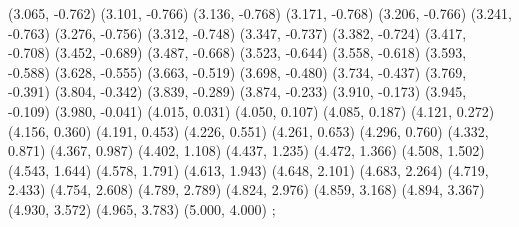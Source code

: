 {  (3.065, -0.762)
  (3.101, -0.766)
  (3.136, -0.768)
  (3.171, -0.768)
  (3.206, -0.766)
  (3.241, -0.763)
  (3.276, -0.756)
  (3.312, -0.748)
  (3.347, -0.737)
  (3.382, -0.724)
  (3.417, -0.708)
  (3.452, -0.689)
  (3.487, -0.668)
  (3.523, -0.644)
  (3.558, -0.618)
  (3.593, -0.588)
  (3.628, -0.555)
  (3.663, -0.519)
  (3.698, -0.480)
  (3.734, -0.437)
  (3.769, -0.391)
  (3.804, -0.342)
  (3.839, -0.289)
  (3.874, -0.233)
  (3.910, -0.173)
  (3.945, -0.109)
  (3.980, -0.041)
  (4.015, 0.031)
  (4.050, 0.107)
  (4.085, 0.187)
  (4.121, 0.272)
  (4.156, 0.360)
  (4.191, 0.453)
  (4.226, 0.551)
  (4.261, 0.653)
  (4.296, 0.760)
  (4.332, 0.871)
  (4.367, 0.987)
  (4.402, 1.108)
  (4.437, 1.235)
  (4.472, 1.366)
  (4.508, 1.502)
  (4.543, 1.644)
  (4.578, 1.791)
  (4.613, 1.943)
  (4.648, 2.101)
  (4.683, 2.264)
  (4.719, 2.433)
  (4.754, 2.608)
  (4.789, 2.789)
  (4.824, 2.976)
  (4.859, 3.168)
  (4.894, 3.367)
  (4.930, 3.572)
  (4.965, 3.783)
  (5.000, 4.000)
};

